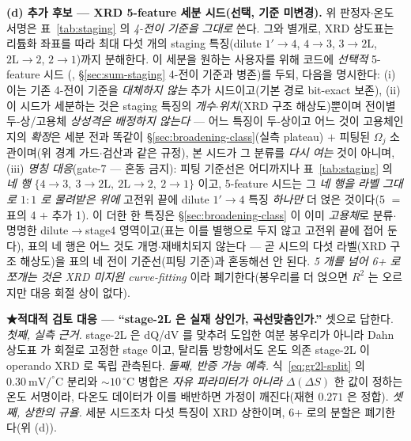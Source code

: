 \textbf{(d) 추가 후보 --- XRD 5-feature 세분 시드(선택, 기준 미변경).} 위 판정자$\cdot$온도 서명은
표~\ref{tab:staging} 의 \emph{4-전이 기준을 그대로} 쓴다. 그와 별개로, XRD 상도표는 리튬화 좌표를 따라 최대
다섯 개의 staging 특징(dilute $1'\!\to\!4$, $4\!\to\!3$, $3\!\to\!2\mathrm L$, $2\mathrm L\!\to\!2$, $2\!\to\!1$)까지
분해한다\cite{dahn1991}. 이 세분을 원하는 사용자를 위해 코드에 \emph{선택적} 5-feature 시드
(, \S\ref{sec:sum-staging} 4-전이 기준과 병존)를 두되, 다음을 명시한다:
(i) 이는 기존 4-전이 기준을 \emph{대체하지 않는} 추가 시드이고(기본 경로 bit-exact 보존),
(ii) 이 시드가 세분하는 것은 staging 특징의 \emph{개수$\cdot$위치}(XRD 구조 해상도)뿐이며 전이별
두-상/고용체 \emph{상성격은 배정하지 않는다} --- 어느 특징이 두-상이고 어느 것이 고용체인지의 \emph{확정}은
세분 전과 똑같이 \S\ref{sec:broadening-class}(실측 plateau) $+$ 피팅된 $\Omega_j$ 소관이며(위 경계 가드$\cdot$검산과
같은 규정), 본 시드가 그 분류를 \emph{다시 여는} 것이 아니며,
(iii) \emph{명칭 대응}(gate-7 --- 혼동 금지): 피팅 기준선은 어디까지나 표~\ref{tab:staging} 의 \emph{네 행}
$\{4\!\to\!3,\ 3\!\to\!2\mathrm L,\ 2\mathrm L\!\to\!2,\ 2\!\to\!1\}$ 이고, 5-feature 시드는 그 \emph{네 행을 라벨
그대로 $1{:}1$ 로 물려받은 위에} 고전위 끝에 dilute $1'\!\to\!4$ 특징 \emph{하나만} 더 얹은 것이다(5 $=$ 표의
4 $+$ 추가 1). 이 더한 한 특징은 \S\ref{sec:broadening-class} 이 이미 \emph{고용체}로 분류$\cdot$명명한
dilute$\to$stage4 영역이고(표는 이를 별행으로 두지 않고 고전위 끝에 접어 둔다), 표의 네 행은 어느 것도
개명$\cdot$재배치되지 않는다 --- 곧 시드의 다섯 라벨(XRD 구조 해상도)을 표의 네 전이 기준선(피팅 기준)과
혼동해선 안 된다. \emph{5 개를 넘어 6+ 로 쪼개는 것은 XRD 미지원 curve-fitting} 이라 폐기한다(봉우리를
더 얹으면 $R^2$ 는 오르지만 대응 회절 상이 없다).

\medskip
\textbf{★적대적 검토 대응 --- ``stage-2L 은 실재 상인가, 곡선맞춤인가.''} 셋으로 답한다. \emph{첫째, 실측 근거.}
stage-2L 은 dQ/dV 를 맞추려 도입한 여분 봉우리가 아니라 Dahn 상도표\cite{dahn1991} 가 회절로 고정한 stage
이고, 탈리튬 방향에서도 온도 의존 stage-2L 이 operando XRD 로 독립 관측된다\cite{schmitt2022}. \emph{둘째,
반증 가능 예측.} 식~\eqref{eq:gr2l-split} 의 $0.30\ \mathrm{mV/^\circ C}$ 분리와 $\sim10\,^\circ$C 병합은
\emph{자유 파라미터가 아니라} $\Delta(\Delta S)$ 한 값이 정하는 온도 서명이라, 다온도 데이터가 이를 배반하면
가정이 깨진다(재현 $0.271$ 은 정합). \emph{셋째, 상한의 규율.} 세분 시드조차 다섯 특징이 XRD 상한이며, 6+ 로의
분할은 폐기한다(위 (d)).

